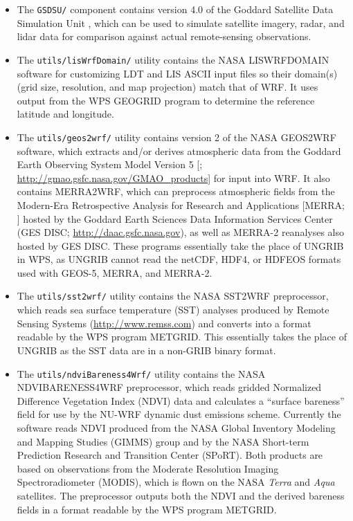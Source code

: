\begin{itemize}
\item The \texttt{GSDSU/} component contains version 4.0 of the Goddard 
  Satellite Data Simulation Unit \citep{ref:GsdsuUserGuide}, which can be used
  to simulate satellite imagery, radar, and lidar data for comparison against 
  actual remote-sensing observations.

\item The \texttt{utils/lisWrfDomain/} utility contains the NASA LISWRFDOMAIN 
  software for customizing LDT and LIS ASCII input files so their domain(s) 
  (grid size, resolution, and map projection) match that of WRF.  It uses 
  output from the WPS GEOGRID program to determine the reference latitude and 
  longitude.

\item The \texttt{utils/geos2wrf/} utility contains version 2 of the NASA
  GEOS2WRF software, which extracts and/or derives atmospheric data from the
  Goddard Earth Observing System Model Version 5 [\cite{ref:RieneckerEtAl2008};
  \url{http://gmao.gsfc.nasa.gov/GMAO\_products}] for input into WRF. It also 
  contains MERRA2WRF, which can preprocess atmospheric fields from the 
  Modern-Era Retrospective Analysis for Research and Applications [MERRA; 
  \cite{ref:RieneckerEtAl2011}] hosted by the Goddard Earth Sciences Data 
  Information Services Center (GES DISC; \url{http://daac.gsfc.nasa.gov}), as 
  well as MERRA-2 reanalyses \citep{ref:BosilovichEtAl2015} also hosted by 
  GES DISC. These programs essentially take the place of UNGRIB in WPS, as 
  UNGRIB cannot read the netCDF, HDF4, or HDFEOS formats used with GEOS-5, 
  MERRA, and MERRA-2.

\item The \texttt{utils/sst2wrf/} utility contains the NASA SST2WRF 
  preprocessor, which reads sea surface temperature (SST) analyses produced by
  Remote Sensing Systems (\url{http://www.remss.com}) and converts into a 
  format readable by the WPS program METGRID. This essentially takes the place
  of UNGRIB as the SST data are in a non-GRIB binary format.

\item The \texttt{utils/ndviBareness4Wrf/} utility contains the NASA\\ 
  NDVIBARENESS4WRF preprocessor, which reads gridded Normalized Difference
  Vegetation Index (NDVI) data and calculates a ``surface bareness'' field
  for use by the NU-WRF dynamic dust emissions scheme.  Currently the
  software reads NDVI produced from the NASA Global Inventory Modeling and
  Mapping Studies (GIMMS) group and by the NASA Short-term Prediction 
  Research and Transition Center (SPoRT).  Both products are based on
  observations from the Moderate Resolution Imaging Spectroradiometer (MODIS),
  which is flown on the NASA \textit{Terra} and \textit{Aqua} satellites.  The
  preprocessor outputs both the NDVI and the derived bareness fields in a 
  format readable by the WPS program METGRID.


\end{itemize}
